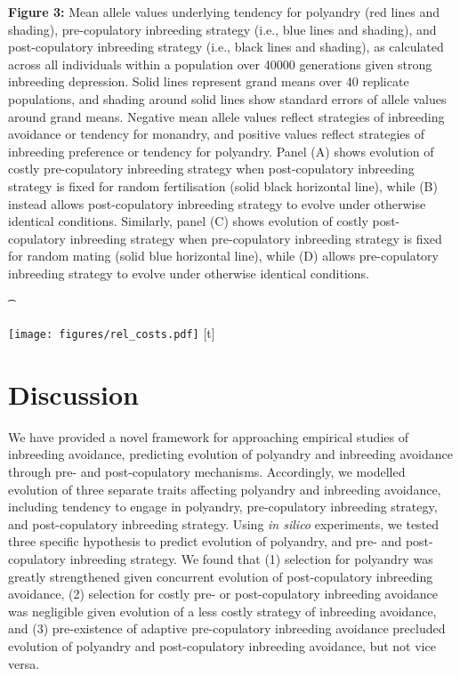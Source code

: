 \documentclass[10pt,letterpaper]{article}
\begin{document}
{\color{Gray}
\begin{adjustwidth}{-2.2in}{0in}
{%
   \begin{justify}\vspace{0.25 mm} \textbf{Figure 3:} Mean allele values underlying tendency for polyandry (red lines and shading), pre-copulatory inbreeding strategy (i.e., blue lines and shading), and post-copulatory inbreeding strategy (i.e., black lines and shading), as calculated across all individuals within a population over 40000 generations given strong inbreeding depression. Solid lines represent grand means over 40 replicate populations, and shading around solid lines show standard errors of allele values around grand means. Negative mean allele values reflect strategies of inbreeding avoidance or tendency for monandry, and positive values reflect strategies of inbreeding preference or tendency for polyandry. Panel (A) shows evolution of costly pre-copulatory inbreeding strategy when post-copulatory inbreeding strategy is fixed for random fertilisation (solid black horizontal line), while (B) instead allows post-copulatory inbreeding strategy to evolve under otherwise identical conditions. Similarly, panel (C) shows evolution of costly post-copulatory inbreeding strategy when pre-copulatory inbreeding strategy is fixed for random mating (solid blue horizontal line), while (D) allows pre-copulatory inbreeding strategy to evolve under otherwise identical conditions.\end{justify}{\t}%
}
{%
   \texttt{[image: figures/rel\_costs.pdf]}%
}%
[t]
\end{adjustwidth}
}


\section*{Discussion}

We have provided a novel framework for approaching empirical studies of inbreeding avoidance, predicting evolution of polyandry and inbreeding avoidance through pre- and post-copulatory mechanisms. Accordingly, we modelled evolution of three separate traits affecting polyandry and inbreeding avoidance, including tendency to engage in polyandry, pre-copulatory inbreeding strategy, and post-copulatory inbreeding strategy. Using \textit{in silico} experiments, we tested three specific hypothesis to predict evolution of polyandry, and pre- and post-copulatory inbreeding strategy. We found that (1) selection for polyandry was greatly strengthened given concurrent evolution of post-copulatory inbreeding avoidance, (2) selection for costly pre- or post-copulatory inbreeding avoidance was negligible given evolution of a less costly strategy of inbreeding avoidance, and (3) pre-existence of adaptive pre-copulatory inbreeding avoidance precluded evolution of polyandry and post-copulatory inbreeding avoidance, but not vice versa.
\end{document}
